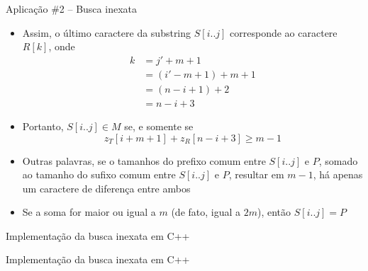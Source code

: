 \begin{frame}[fragile]{Aplicação \#2 -- Busca inexata}

    \begin{itemize}
        \item Assim, o último caractere da substring $S[i..j]$ corresponde
            ao caractere $R[k]$, onde
        \begin{align*}
            k &= j' + m + 1 \\
              &= (i' - m + 1) + m + 1 \\
              &= (n - i + 1) + 2 \\
              &= n - i + 3
        \end{align*}

        \item Portanto, $S[i..j]\in M$ se, e somente se
        \[
            z_T[i + m + 1] + z_R[n - i + 3] \geq m - 1
        \]

        \item Outras palavras, se o tamanhos do prefixo comum entre $S[i..j]$ e $P$, somado ao
            tamanho do sufixo comum entre $S[i..j]$ e $P$, resultar em $m - 1$, há apenas um
            caractere de diferença entre ambos

        \item Se a soma for maior ou igual a $m$ (de fato, igual a $2m$),  então $S[i..j] = P$
    \end{itemize}

\end{frame}



\begin{frame}[fragile]{Implementação da busca inexata em C++}
\end{frame}

\begin{frame}[fragile]{Implementação da busca inexata em C++}
\end{frame}
